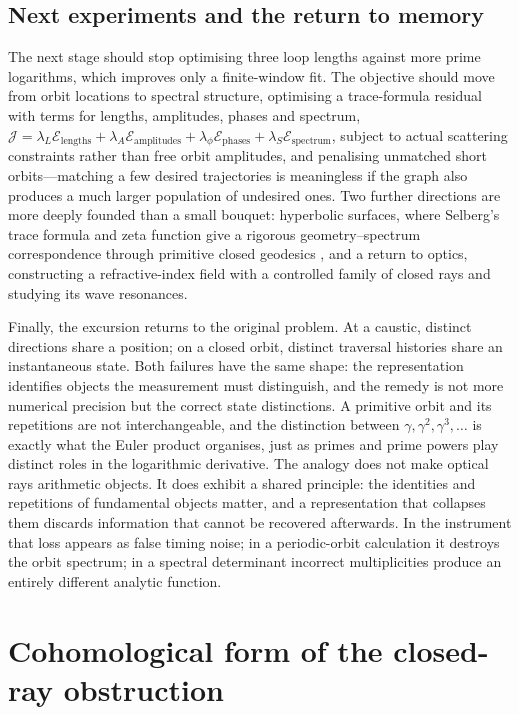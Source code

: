 \documentclass[11pt]{article}
\begin{document}
\subsection{Next experiments and the return to memory}

The next stage should stop optimising three loop lengths against more prime logarithms,
which improves only a finite-window fit. The objective should move from orbit locations to
spectral structure, optimising a trace-formula residual with terms for lengths,
amplitudes, phases and spectrum,
$\mathcal{J}=\lambda_L\mathcal{E}_{\mathrm{lengths}}
+\lambda_A\mathcal{E}_{\mathrm{amplitudes}}
+\lambda_\phi\mathcal{E}_{\mathrm{phases}}
+\lambda_S\mathcal{E}_{\mathrm{spectrum}}$,
subject to actual scattering constraints rather than free orbit amplitudes, and penalising
unmatched short orbits---matching a few desired trajectories is meaningless if the graph
also produces a much larger population of undesired ones. Two further directions are more
deeply founded than a small bouquet: hyperbolic surfaces, where Selberg's trace formula and
zeta function give a rigorous geometry--spectrum correspondence through primitive closed
geodesics \cite{selberg1956}, and a return to optics, constructing a refractive-index field
with a controlled family of closed rays and studying its wave resonances.

Finally, the excursion returns to the original problem. At a caustic, distinct directions
share a position; on a closed orbit, distinct traversal histories share an instantaneous
state. Both failures have the same shape: the representation identifies objects the
measurement must distinguish, and the remedy is not more numerical precision but the
correct state distinctions. A primitive orbit and its repetitions are not interchangeable,
and the distinction between $\gamma,\gamma^2,\gamma^3,\dots$ is exactly what the Euler
product organises, just as primes and prime powers play distinct roles in the logarithmic
derivative. The analogy does not make optical rays arithmetic objects. It does exhibit a
shared principle: the identities and repetitions of fundamental objects matter, and a
representation that collapses them discards information that cannot be recovered
afterwards. In the instrument that loss appears as false timing noise; in a periodic-orbit
calculation it destroys the orbit spectrum; in a spectral determinant incorrect
multiplicities produce an entirely different analytic function.

\section{Cohomological form of the closed-ray obstruction}\label{app:cocycle}
\end{document}
